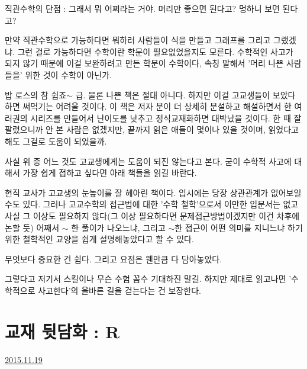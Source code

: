 직관수학의 단점 : 그래서 뭐 어쩌라는 거야. 머리만 좋으면 된다고? 멍하니 보면 된다고?
\vspace{5mm}

만약 직관수학으로 가능하다면 뭐하러 사람들이 식을 만들고 그래프를 그리고 그랬겠냐.
그런 걸로 가능하다면 수학이란 학문이 필요없었을지도 모른다.
수학적인 사고가 되지 않기 때문에 이걸 보완하려고 만든 학문이 수학이다, 속칭 말해서 '머리 나쁜 사람들을' 위한 것이 수학이 아닌가.
\vspace{5mm}

밥 로스의 참 쉽죠$\sim$ 급.
물론 나쁜 책은 절대 아니다. 하지만 이걸 고교생들이 보았다하면 써먹기는 어려울 것이다.
이 책은 저자 분이 더 상세히 분설하고 해설하면서 한 여러권의 시리즈를 만들어서 난이도를 낮추고 정식교재화하면 대박났을 것이다.
한 때 잘 팔렸으니까 안 본 사람은 없겠지만, 끝까지 읽은 애들이 몇이나 있을 것이며, 읽었다고 해도 그걸로 도움이 되었을까.
\vspace{5mm}

사실 위 중 어느 것도 고교생에게는 도움이 되진 않는다고 본다.
굳이 수학적 사고에 대해서 가장 쉽게 접하고 싶다면 아래 책들을 읽길 바란다.
\vspace{5mm}

현직 교사가 고교생의 눈높이를 잘 헤아린 책이다.
입시에는 당장 상관관계가 없어보일 수도 있다. 그러나 고교수학의 접근법에 대한 '수학 철학'으로서 이만한 입문서는 없고
사실 그 이상도 필요하지 않다(그 이상 필요하다면 문제접근방법이겠지만 이건 차후에 논할 듯)
어째서 $\sim$ 한 풀이가 나오느냐, 그리고 $\sim$한 접근이 어떤 의미를 지니느냐 하기 위한 철학적인 교양을 쉽게 설명해놓았다고 할 수 있다.
\vspace{5mm}

무엇보다 중요한 건 쉽다. 그리고 요점은 웬만큼 다 담아놓았다.
\vspace{5mm}

그렇다고 저기서 스킬이나 무슨 수험 꼼수 기대하진 말길.
하지만 제대로 읽고나면 '수학적으로 사고한다'의 올바른 길을 걷는다는 건 보장한다.
\vspace{5mm}








\section{교재 뒷담화 : R}
\href{https://www.kockoc.com/Apoc/500147}{2015.11.19}

\vspace{5mm}

